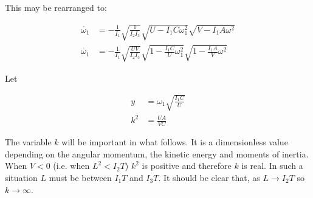 \documentclass[a4paper, 12pt]{article}
\begin{document}
This may be rearranged to:

  \begin{align}
    \dot{\omega_1} &= -\frac{1}{I_1}\sqrt{\frac{1}{I_2I_3}}\sqrt{U-I_1C\omega_1^2}\sqrt{V-I_1A\omega^2} \\
    \dot{\omega_1} &= -\frac{1}{I_1}\sqrt{\frac{UV}{I_2I_3}}\sqrt{1 - \frac{I_1C}{U}\omega_1^2}\sqrt{1-\frac{I_1A}{V}\omega^2}\label{eq:fullnode}
  \end{align}

Let

\begin{align}
  y &= \omega_1\sqrt{\frac{I_1C}{U}} \label{eq:defy}\\
  k^2 & = \frac{UA}{VC}\label{eq:defk}
\end{align}

The variable $k$ will be important in what follows. It is a dimensionless value depending on the angular momentum, the kinetic energy and moments of inertia. When $V < 0$ (i.e. when $L^2 < I_2T$) $k^2$ is positive and therefore $k$ is real. In such a situation $L$ must be between $I_1T$ and $I_3T$.  It should be clear that, as $L\to I_2T$ so $k\to\infty$.

%

\end{document}
